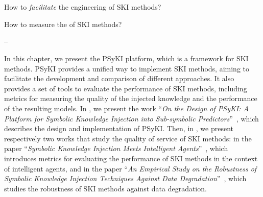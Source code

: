 
\chapter[Platform for symbolic knowledge injection]{}
\label{ch:psyki}

\begin{flushright}
\begin{minipage}{0.5\textwidth}
    How to \emph{facilitate} the engineering of \gls{SKI} methods?

    How to measure the \emph{} of \gls{SKI} methods?

    -- \textbf{}
\end{minipage}
\end{flushright}

\minitoc

In this chapter, we present the \Gls{PSyKI} platform, which is a framework for \gls{SKI} methods.
%
\Gls{PSyKI} provides a unified way to implement \gls{SKI} methods, aiming to facilitate the development and comparison of different approaches.
%
It also provides a set of tools to evaluate the performance of \gls{SKI} methods, including metrics for measuring the quality of the injected knowledge and the performance of the resulting models.
%
In , we present the work ``\emph{On the Design of PSyKI: A Platform for Symbolic Knowledge Injection into Sub-symbolic Predictors}''~\cite{DBLP:conf/atal/MagniniCO22}, which describes the design and implementation of \gls{PSyKI}.
%
Then, in , we present respectively two works that study the quality of service of \gls{SKI} methods:
%
in  the paper ``\emph{Symbolic Knowledge Injection Meets Intelligent Agents}''~\cite{DBLP:journals/aamas/AgiolloRMCO23},
%
which introduces metrics for evaluating the performance of \gls{SKI} methods in the context of intelligent agents,
%
and in  the paper ``\emph{An Empirical Study on the Robustness of Symbolic Knowledge Injection Techniques Against Data Degradation}''~\cite{DBLP:conf/woa/RafanelliMACO24},
%
which studies the robustness of \gls{SKI} methods against data degradation.


